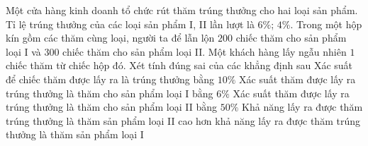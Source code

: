 \begin{ex}%

	Một cửa hàng kinh doanh tổ chức rút thăm trúng thưởng cho hai loại sản phẩm. Tỉ lệ trúng thưởng của các loại sản phẩm I, II lần lượt là $6 \%$; $4 \%$. Trong một hộp kín gồm các thăm cùng loại, người ta để lẫn lộn $200$ chiếc thăm cho sản phẩm loại I và $300$ chiếc thăm cho sản phẩm loại II. Một khách hàng lấy ngẫu nhiên $1$ chiếc thăm từ chiếc hộp đó. Xét tính đúng sai của các khẳng định sau
	\choiceTF
	{Xác suất để chiếc thăm được lấy ra là trúng thưởng bằng $10\%$}
	{Xác suất thăm được lấy ra trúng thưởng là thăm cho sản phẩm loại I bằng $6\%$ }
	{\True Xác suất thăm được lấy ra trúng thưởng là thăm cho sản phẩm loại II bằng $50\%$}
	{Khả năng lấy ra được thăm trúng thưởng là thăm sản phẩm loại II cao hơn khả năng lấy ra được thăm trúng thưởng là thăm sản phẩm loại I}
\end{ex}

